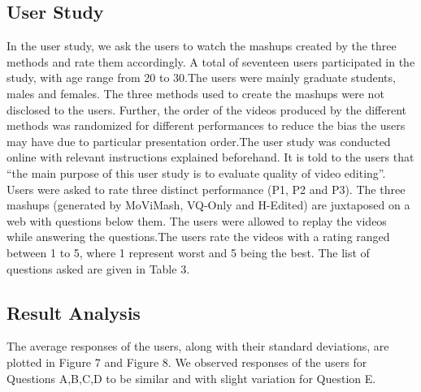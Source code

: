 \documentclass{IEEEtran}
\begin{document}
\subsection{User Study}
In the user study, we ask the users to watch the mashups created by the three methods and rate them accordingly. A total of seventeen users participated in the study, with age range from 20 to 30.The users were mainly graduate students, males and females. The three methods used to create the mashups were not disclosed to the users. Further, the order of the videos produced by the different methods was randomized for different performances to reduce the bias the users may have due to particular presentation order.The user study was conducted online with relevant instructions explained beforehand. It is told to the users that “the main purpose of this user study is to evaluate quality of video editing”. Users were asked to rate three distinct performance (P1, P2 and P3). The three mashups (generated by MoViMash, VQ-Only and H-Edited)
are juxtaposed on a web with questions below them. The users were allowed to replay the videos while answering the questions.The users rate the videos with a rating ranged between 1 to 5, where 1 represent worst and 5 being the best. The list of questions asked are given in Table 3.\\
\subsection{Result Analysis}
The average responses of the users, along with their standard deviations, are plotted in Figure 7 and Figure 8. We observed responses of the users for Questions A,B,C,D to be similar and with
slight variation for Question E.
\end{document}
